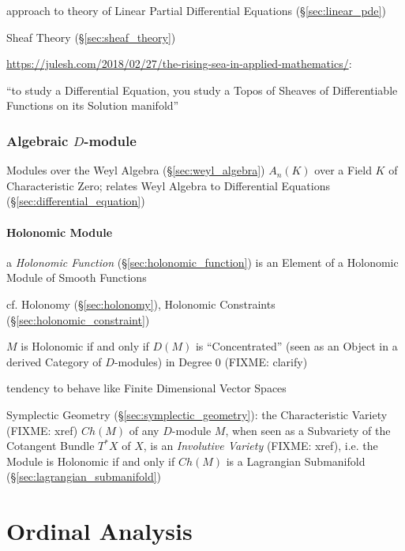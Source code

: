 {approach to theory of Linear Partial Differential Equations
(\S\ref{sec:linear_pde})

Sheaf Theory (\S\ref{sec:sheaf_theory})

\url{https://julesh.com/2018/02/27/the-rising-sea-in-applied-mathematics/}:

``to study a Differential Equation, you study a Topos of Sheaves of
Differentiable Functions on its Solution manifold''



\subsubsection{Algebraic $D$-module}\label{sec:algebraic_d_module}

Modules over the Weyl Algebra (\S\ref{sec:weyl_algebra}) $A_n(K)$ over a Field
$K$ of Characteristic Zero; relates Weyl Algebra to Differential Equations
(\S\ref{sec:differential_equation})



\paragraph{Holonomic Module}\label{sec:holonomic_module}\hfill

a \emph{Holonomic Function} (\S\ref{sec:holonomic_function}) is an Element of a
Holonomic Module of Smooth Functions

\fist cf. Holonomy (\S\ref{sec:holonomy}), Holonomic Constraints
(\S\ref{sec:holonomic_constraint})

$M$ is Holonomic if and only if $D(M)$ is ``Concentrated'' (seen as an Object
in a derived Category of $D$-modules) in Degree $0$ (FIXME: clarify)

tendency to behave like Finite Dimensional Vector Spaces

\fist Symplectic Geometry (\S\ref{sec:symplectic_geometry}): the Characteristic
Variety (FIXME: xref) $Ch(M)$ of any $D$-module $M$, when seen as a Subvariety
of the Cotangent Bundle $T^*X$ of $X$, is an \emph{Involutive Variety} (FIXME:
xref), i.e. the Module is Holonomic if and only if $Ch(M)$ is a Lagrangian
Submanifold (\S\ref{sec:lagrangian_submanifold})



\section{Ordinal Analysis}\label{sec:ordinal_analysis}

}
